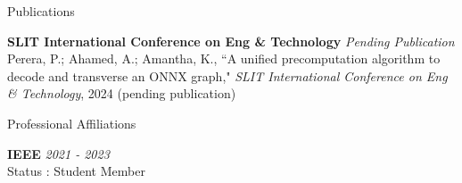 \documentclass[
	11pt, %
]{./../assets/resume} %
\begin{document}





\begin{rSection}{Publications}

	\textbf{SLIT International Conference on Eng \& Technology } \hfill  \textit{Pending Publication}\\
	Perera, P.; Ahamed, A.; Amantha, K., ``A unified precomputation algorithm to decode and transverse an ONNX graph," \emph{SLIT International Conference on Eng \& Technology}, 2024 (pending publication)


\end{rSection}


\begin{rSection}{Professional Affiliations}

	\textbf{IEEE} \hfill \textit{2021 - 2023} \\ 
	Status : Student Member

\end{rSection}



\end{document}
